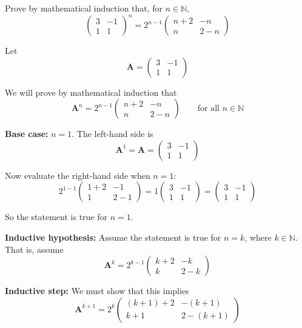 \documentclass[leqno]{article}
\begin{document}
\begin{enumerate}[
  label=\textbf{\arabic*.},
  leftmargin=*,
  topsep=0pt,
  partopsep=0pt,
  parsep=0pt
]
Prove by mathematical induction that, for $n \in \mathbb{N}$,
\[
\begin{pmatrix}
3 & -1 \\
1 & 1
\end{pmatrix}^n = 2^{n-1}
\begin{pmatrix}
n+2 & -n \\
n & 2-n
\end{pmatrix}
\]

\vspace*{10pt}

\begin{djsSolution}
Let
\[
\mathbf{A}=\begin{pmatrix}
3 & -1\\
1 & 1
\end{pmatrix}
\]

We will prove by mathematical induction that
\[
\mathbf{A}^n=2^{n-1}\begin{pmatrix}
n+2 & -n\\
n & 2-n
\end{pmatrix}
\qquad \text{for all } n\in\mathbb{N}
\]

\textbf{Base case:} \(n=1\). The left-hand side is
\[
\mathbf{A}^1=\mathbf{A}=\begin{pmatrix}
3 & -1\\
1 & 1
\end{pmatrix}
\]

Now evaluate the right-hand side when \(n=1\):
\[
2^{1-1}\begin{pmatrix}
1+2 & -1\\
1 & 2-1
\end{pmatrix}
=
1\begin{pmatrix}
3 & -1\\
1 & 1
\end{pmatrix}
=
\begin{pmatrix}
3 & -1\\
1 & 1
\end{pmatrix}
\]

So the statement is true for \(n=1\).

\textbf{Inductive hypothesis:} Assume the statement is true for \(n=k\), where \(k\in\mathbb{N}\). That is, assume
\[
\mathbf{A}^k=2^{k-1}\begin{pmatrix}
k+2 & -k\\
k & 2-k
\end{pmatrix}
\]

\textbf{Inductive step:} We must show that this implies
\[
\mathbf{A}^{k+1}=2^k\begin{pmatrix}
(k+1)+2 & -(k+1)\\
k+1 & 2-(k+1)
\end{pmatrix}
\]


\end{djsSolution}
\end{enumerate}
\end{document}
